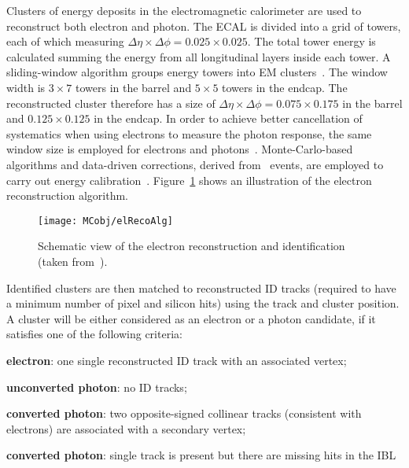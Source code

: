 			Clusters of energy deposits in the electromagnetic calorimeter are used to reconstruct both electron and photon. The \ac{ECAL} is divided into a grid of towers, each of which measuring $\Delta \eta \times \Delta \phi = 0.025 \times 0.025$. The total tower energy is calculated summing the energy from all longitudinal layers inside each tower. A sliding-window algorithm groups energy towers into \ac{EM} clusters~\cite{ATL-PHYS-PUB-2016-015,Aad:2014nim}. The window width is $3 \times 7$ towers in the barrel and $5 \times 5$ towers in the endcap. The reconstructed cluster therefore has a size of $\Delta \eta \times \Delta \phi = 0.075 \times 0.175$ in the barrel and $0.125 \times 0.125$ in the endcap. In order to achieve better cancellation of systematics when using electrons to measure the photon response, the same window size is employed for electrons and photons~\cite{ATL-PHYS-PUB-2016-015}. Monte-Carlo-based algorithms and data-driven corrections, derived from \Zee\ events, are employed to carry out energy calibration~\cite{ATL-PHYS-PUB-2016-015}. Figure~\ref{fig:elRecoAlg} shows an illustration of the electron reconstruction algorithm.

			\begin{figure}[!htb]
				\centering
				\texttt{[image: MCobj/elRecoAlg]}
				\caption{\label{fig:elRecoAlg} Schematic view of the electron reconstruction and identification (taken from~\cite{ATLAS:2016iqc}).}
			\end{figure}

			Identified clusters are then matched to reconstructed \ac{ID} tracks (required to have a minimum number of pixel and silicon hits) using the track and cluster position. A cluster will be either considered as an electron or a photon candidate, if it satisfies one of the following criteria:

			\begin{description}
				\item \textbf{electron}: one single reconstructed \ac{ID} track with an associated vertex;
				\item \textbf{unconverted photon}: no \ac{ID} tracks;
				\item \textbf{converted photon}: two opposite-signed collinear tracks (consistent with electrons) are associated with a secondary vertex;
				\item \textbf{converted photon}: single track is present but there are missing hits in the \ac{IBL}
			\end{description}

